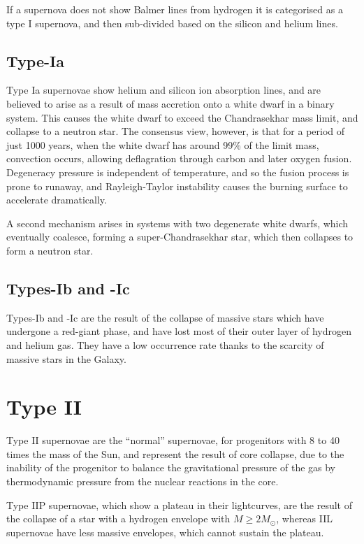 If a supernova does not show Balmer lines from hydrogen it is
categorised as a type I supernova, and then sub-divided based on the
silicon and helium lines.

\subsection{Type-Ia}
\label{sec:type-ia}

Type Ia supernovae show helium and silicon ion absorption lines, and
are believed to arise as a result of mass accretion onto a white dwarf
in a binary system. This causes the white dwarf to exceed the
Chandrasekhar mass limit, and collapse to a neutron star. The
consensus view, however, is that for a period of just 1000 years, when
the white dwarf has around 99\% of the limit mass, convection occurs,
allowing deflagration through carbon and later oxygen
fusion. Degeneracy pressure is independent of temperature, and so the
fusion process is prone to runaway, and Rayleigh-Taylor instability
causes the burning surface to accelerate dramatically.

A second mechanism arises in systems with two degenerate white dwarfs,
which eventually coalesce, forming a super-Chandrasekhar star, which
then collapses to form a neutron star.

\subsection{Types-Ib and -Ic}
\label{sec:types-ib-ic}

Types-Ib and -Ic are the result of the collapse of massive stars which
have undergone a red-giant phase, and have lost most of their outer
layer of hydrogen and helium gas. They have a low occurrence rate
thanks to the scarcity of massive stars in the Galaxy.

\section{Type II}
\label{sec:type-ii}

Type II supernovae are the ``normal'' supernovae, for progenitors with
8 to 40 times the mass of the Sun, and represent the result of core
collapse, due to the inability of the progenitor to balance the
gravitational pressure of the gas by thermodynamic pressure from the
nuclear reactions in the core.

Type IIP supernovae, which show a plateau in their lightcurves, are
the result of the collapse of a star with a hydrogen envelope with
$M\ge 2M_{\odot}$, whereas IIL supernovae have less massive envelopes,
which cannot sustain the plateau.

